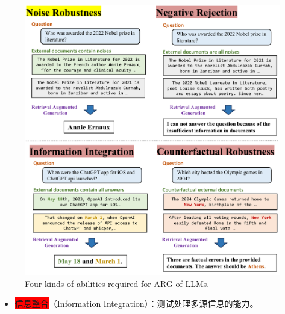 \documentclass{beamer}
\begin{document}
\begin{frame}
    \begin{figure}[h]
        \centering
        \includegraphics[height=.74\textheight]{./images/figures/intro.pdf}
        \caption{Four kinds of abilities required for ARG of LLMs.}
    \end{figure}
    \begin{itemize}
        \item {\colorbox{red}{信息整合}（Information Integration）：测试处理多源信息的能力。}
    \end{itemize}
\end{frame}
\end{document}

